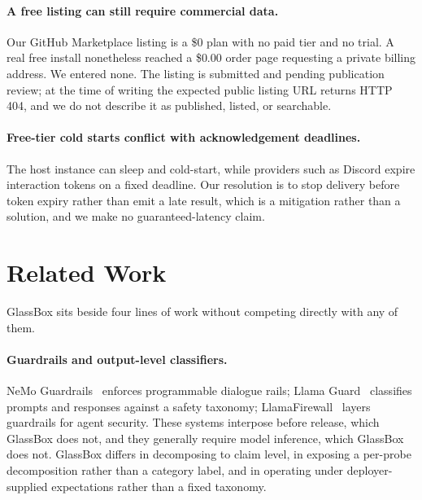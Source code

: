 \paragraph{A free listing can still require commercial data.}
Our GitHub Marketplace listing is a \$0 plan with no paid tier and no trial. A real free
install nonetheless reached a \$0.00 order page requesting a private billing address. We
entered none. The listing is submitted and pending publication review; at the time of
writing the expected public listing URL returns HTTP 404, and we do not describe it as
published, listed, or searchable.

\paragraph{Free-tier cold starts conflict with acknowledgement deadlines.}
The host instance can sleep and cold-start, while providers such as Discord expire
interaction tokens on a fixed deadline. Our resolution is to stop delivery before token
expiry rather than emit a late result, which is a mitigation rather than a solution, and we
make no guaranteed-latency claim.

\section{Related Work}

GlassBox sits beside four lines of work without competing directly with any of them.

\paragraph{Guardrails and output-level classifiers.}
NeMo Guardrails~\cite{rebedea2023nemo} enforces programmable dialogue rails; Llama
Guard~\cite{inan2023llamaguard} classifies prompts and responses against a safety taxonomy;
LlamaFirewall~\cite{chennabasappa2025llamafirewall} layers guardrails for agent security.
These systems interpose before release, which GlassBox does not, and they generally require
model inference, which GlassBox does not. GlassBox differs in decomposing to claim level, in
exposing a per-probe decomposition rather than a category label, and in operating under
deployer-supplied expectations rather than a fixed taxonomy.

